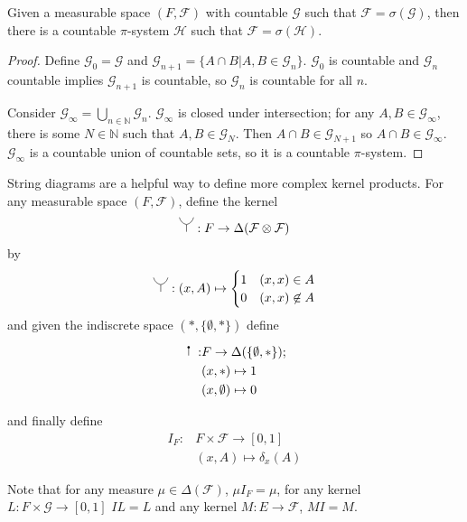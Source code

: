 \begin{lemma}\label{lem:cgpisys}
Given a measurable space $(F,\mathcal{F})$ with countable $\mathcal{G}$ such that $\mathcal{F}=\sigma(\mathcal{G})$, then there is a countable $\pi$-system $\mathcal{H}$ such that $\mathcal{F}=\sigma(\mathcal{H})$.
\end{lemma}

\begin{proof}
Define $\mathcal{G}_0 = \mathcal{G}$ and $\mathcal{G}_{n+1} = \{A\cap B|A,B\in \mathcal{G}_n\}$. $\mathcal{G}_0$ is countable and $\mathcal{G}_n$ countable implies $\mathcal{G}_{n+1}$ is countable, so $\mathcal{G}_n$ is countable for all $n$.

Consider $\mathcal{G}_\infty = \bigcup_{n\in\mathbb{N}} \mathcal{G}_n$. $\mathcal{G}_\infty$ is closed under intersection; for any $A,B\in\mathcal{G}_\infty$, there is some $N\in \mathbb{N}$ such that $A,B\in \mathcal{G}_N$. Then $A\cap B\in\mathcal{G}_{N+1}$ so $A\cap B\in \mathcal{G}_\infty$. $\mathcal{G}_\infty$ is a countable union of countable sets, so it is a countable $\pi$-system.
\end{proof}

String diagrams are a helpful way to define more complex kernel products\cite{fong_causal_2013}. For any measurable space $(F,\mathcal{F})$, define the kernel
\begin{align}
    \splitter{0.2}:F\to \Delta(\mathcal{F}\otimes\mathcal{F})
\end{align} 
by 
\begin{align}
    \splitter{0.2}:(x,A)\mapsto \begin{cases}1 & (x,x)\in A\\ 0 & (x,x)\not\in A \end{cases}
\end{align} 
and given the indiscrete space $(*,\{\emptyset, *\})$ define
\begin{align}
    \stopper{0.2}:&F\to \Delta(\{\emptyset,*\});\\
                  &(x,*)\mapsto 1\\
                  &(x,\emptyset)\mapsto 0
\end{align}

and finally define
\begin{align}
    I_F:&F\times \mathcal{F} \to [0,1]\\
      &(x,A)\mapsto \delta_x(A)
\end{align}

Note that for any measure $\mu\in \Delta(\mathcal{F})$, $\mu I_F=\mu$, for any kernel $L:F\times \mathcal{G}\to [0,1]$ $IL=L$ and any kernel $M:E\to \mathcal{F}$, $MI=M$.

